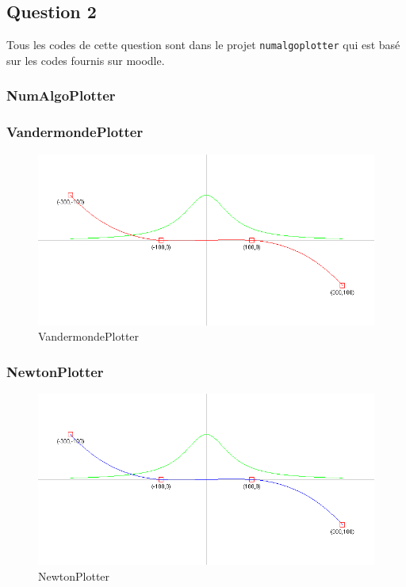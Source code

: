 \subsection{Question 2}

Tous les codes de cette question sont dans le projet \texttt{numalgoplotter} qui est basé sur les codes fournis sur moodle. 

\subsubsection{NumAlgoPlotter}

\subsubsection{VandermondePlotter}

\begin{figure}[H]
	\centering
	\caption{\label{vandermonde} VandermondePlotter}
	\includegraphics[scale = 0.4]{Figures/6_VandermondePlotter.png}
\end{figure}

\subsubsection{NewtonPlotter}

\begin{figure}[H]
	\centering
	\caption{\label{newton} NewtonPlotter}
	\includegraphics[scale = 0.4]{Figures/6_NewtonPlotter.png}
\end{figure}